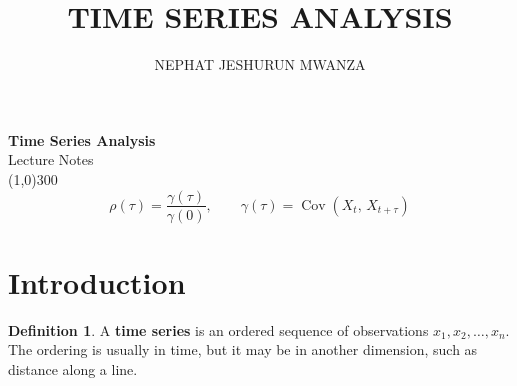 \documentclass[11pt,a4paper]{article}
\theoremstyle{definition}
\newtheorem{defn}[thm]{Definition}
\DeclareMathOperator{\Cov}{Cov}
\begin{document}
\begin{titlepage}
\thispagestyle{empty}
\begin{center}
\vspace*{3cm}
{\Huge\bfseries Time Series Analysis}\\[1.2cm]
{\large Lecture Notes}\\[2.5cm]
\line(1,0){300}\\[1.5cm]
$$\rho(\tau) = \frac{\gamma(\tau)}{\gamma(0)},
\qquad \gamma(\tau) = \Cov\left(X_t,\,X_{t+\tau}\right)$$
\end{center}
\end{titlepage}

\tableofcontents
\thispagestyle{empty}
\clearpage
\setcounter{page}{1}


\title{\textbf{TIME SERIES ANALYSIS}}
\author{NEPHAT JESHURUN MWANZA}
\maketitle

\begin{center}
\hrulefill
\end{center}

\section{Introduction}
\begin{defn}
A \textbf{time series} is an ordered sequence of observations $x_1, x_2, \dots, x_n$. The ordering is usually in
time, but it may be in another dimension, such as distance along a line.
\end{defn}
\end{document}
